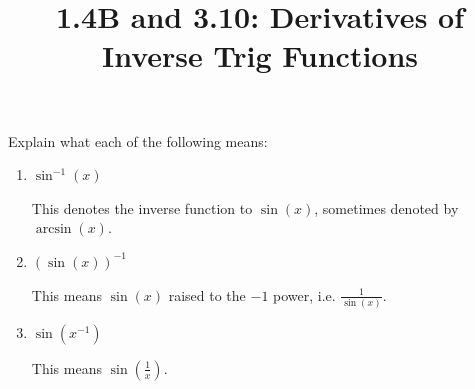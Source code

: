 \documentclass[nooutcomes,handout]{ximera}
\title{1.4B and 3.10: Derivatives of Inverse Trig Functions}
\begin{document}
\begin{abstract}		\end{abstract}
\maketitle

\begin{problem}
Explain what each of the following means:
	\begin{enumerate}
	
	\item  $\sin^{-1}(x)$
		\begin{freeResponse}
		This denotes the inverse function to $\sin(x)$, sometimes denoted by $\arcsin(x)$.  
		\end{freeResponse}	
		
	\item  $\left( \sin(x) \right)^{-1}$
		\begin{freeResponse}
		This means $\sin(x)$ raised to the $-1$ power, i.e. $\frac{1}{\sin(x)}$.  
		\end{freeResponse}	
		
	\item  $\sin \left(x^{-1} \right)$
		\begin{freeResponse}
		This means $\sin \left( \frac{1}{x} \right)$.
		\end{freeResponse}	
		
	\end{enumerate}
\end{problem}
\end{document}
